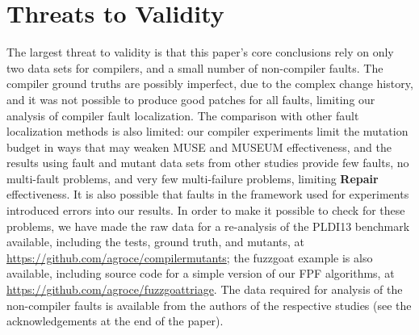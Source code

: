 \section{Threats to Validity}

The largest threat to validity is that this paper's core conclusions rely on only two data sets for compilers, and a small number of non-compiler faults.  The compiler ground truths are possibly imperfect, due to the complex change history, and it was not possible to produce good patches for all faults, limiting our analysis of compiler fault localization.    The comparison with other fault localization methods is also limited:  our compiler experiments limit the mutation budget in ways that may weaken MUSE and MUSEUM effectiveness, and the results using fault and mutant data sets from other studies provide few faults, no multi-fault problems, and very few multi-failure problems, limiting {\bf Repair} effectiveness.   It is also possible that faults in the framework used for experiments introduced errors into our results.  In order to make it possible to check for these problems, we have made the raw data for a re-analysis of the PLDI13 benchmark available, including the tests, ground truth, and mutants, at \url{https://github.com/agroce/compilermutants}; the fuzzgoat example is also available, including source code for a simple version of our FPF algorithms, at \url{https://github.com/agroce/fuzzgoattriage}.  The data required for analysis of the non-compiler faults is available from the authors of the respective studies (see the acknowledgements at the end of the paper).
